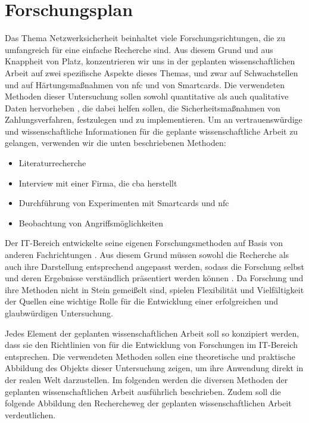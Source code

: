 \section{Forschungsplan}

Das Thema Netzwerksicherheit beinhaltet viele Forschungsrichtungen, die zu umfangreich für eine einfache
Recherche sind. Aus diesem Grund und aus Knappheit von Platz, konzentrieren wir uns in der geplanten 
wissenschaftlichen Arbeit auf zwei spezifische Aspekte dieses Themas, und zwar auf Schwachstellen und 
auf Härtungsmaßnahmen von \acrshort{nfc} und von Smartcards. Die verwendeten Methoden dieser Untersuchung 
sollen sowohl quantitative als auch qualitative Daten hervorheben \cite{refbook:RMJL}, die dabei helfen sollen, 
die Sicherheitsmaßnahmen von Zahlungsverfahren, festzulegen und zu implementieren. Um an vertrauenswürdige 
und wissenschaftliche Informationen für die geplante wissenschaftliche Arbeit zu gelangen, verwenden wir 
die unten beschriebenen Methoden:

\begin{itemize}
  \item Literaturrecherche
  \item Interview mit einer Firma, die \acrfull{cba} herstellt
  \item Durchführung von Experimenten mit Smartcards und \acrshort{nfc}
  \item Beobachtung von Angriffsmöglichkeiten
\end{itemize}

Der IT-Bereich entwickelte seine eigenen Forschungsmethoden auf Basis von anderen Fachrichtungen \cite{inbook:AHDS}.
Aus diesem Grund müssen sowohl die Recherche als auch ihre Darstellung entsprechend angepasst werden, sodass 
die Forschung selbst und deren Ergebnisse verständlich präsentiert werden können \cite{refbook:RMJL}. Da Forschung und 
ihre Methoden nicht in Stein gemeißelt sind, spielen Flexibilität und Vielfältigkeit der Quellen eine wichtige 
Rolle für die Entwicklung einer erfolgreichen und glaubwürdigen Untersuchung.

Jedes Element der geplanten wissenschaftlichen Arbeit soll so konzipiert werden, dass sie den Richtlinien von
\cite{refip:SGRM} für die Entwicklung von Forschungen im IT-Bereich entsprechen. Die verwendeten Methoden 
sollen eine theoretische und praktische Abbildung des Objekts dieser Untersuchung zeigen, um ihre Anwendung 
direkt in der realen Welt darzustellen. Im folgenden werden die diversen Methoden der geplanten wissenschaftlichen 
Arbeit ausführlich beschrieben. Zudem soll die folgende Abbildung den Rechercheweg der geplanten wissenschaftlichen 
Arbeit verdeutlichen.


